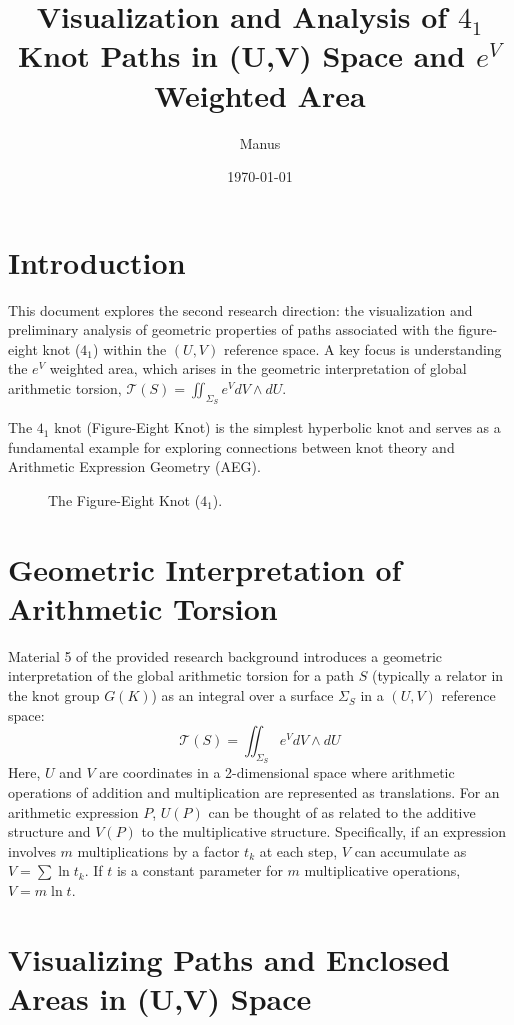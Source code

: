 \documentclass{article}
\title{Visualization and Analysis of $4_1$ Knot Paths in (U,V) Space and $e^V$ Weighted Area}
\author{Manus}
\date{\today}
\begin{document}
\maketitle

\section{Introduction}
This document explores the second research direction: the visualization and preliminary analysis of geometric properties of paths associated with the figure-eight knot ($4_1$) within the $(U,V)$ reference space. A key focus is understanding the $e^V$ weighted area, which arises in the geometric interpretation of global arithmetic torsion, $\mathcal{T}(S) = \iint_{\Sigma_S} e^V dV \wedge dU$.

The $4_1$ knot (Figure-Eight Knot) is the simplest hyperbolic knot and serves as a fundamental example for exploring connections between knot theory and Arithmetic Expression Geometry (AEG).

\begin{figure}[h!]
    \centering
    
    \caption{The Figure-Eight Knot ($4_1$).}
    \label{fig:knot_4_1_q2}
\end{figure}

\section{Geometric Interpretation of Arithmetic Torsion}
Material 5 of the provided research background introduces a geometric interpretation of the global arithmetic torsion for a path $S$ (typically a relator in the knot group $G(K)$) as an integral over a surface $\Sigma_S$ in a $(U,V)$ reference space:
\[
\mathcal{T}(S) = \iint_{\Sigma_S} e^V dV \wedge dU
\]
Here, $U$ and $V$ are coordinates in a 2-dimensional space where arithmetic operations of addition and multiplication are represented as translations. For an arithmetic expression $P$, $U(P)$ can be thought of as related to the additive structure and $V(P)$ to the multiplicative structure. Specifically, if an expression involves $m$ multiplications by a factor $t_k$ at each step, $V$ can accumulate as $V = \sum \ln t_k$. If $t$ is a constant parameter for $m$ multiplicative operations, $V = m \ln t$.

\section{Visualizing Paths and Enclosed Areas in (U,V) Space}
\end{document}
